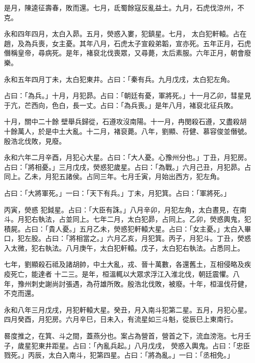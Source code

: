 \begin{pinyinscope}
 是月，陳逵征壽春，敗而還。七月，氐蜀餘寇反亂益土。九月，石虎伐涼州，不克。



 永和四年四月，太白入昴。五月，熒惑入婁，犯鎮星。七月，
 太白犯軒轅。占在趙，及為兵喪，女主憂。其年八月，石虎太子宣殺弟韜，宣亦死。五年正月，石虎僭稱皇帝，尋病死。是年，褚裒北伐喪眾，又尋薨，太后素服。六年正月，朝會廢樂。



 永和五年四月丁未，太白犯東井。占曰：「秦有兵。九月戊戌，太白犯左角。



 占曰：「為兵。」十月，月犯昴。占曰：「朝廷有憂，軍將死。」十一月乙卯，彗星見于亢，芒西向，色白，長一丈。占曰：「為兵喪。」是年八月，褚裒北征兵敗。



 十月，關中二十餘
 壁舉兵歸從，石遵攻沒南陽。十一月，冉閔殺石遵，又盡殺胡十餘萬人，於是中土大亂。十二月，褚裒薨。八年，劉顯、苻健、慕容俊並僭號。殷浩北伐敗，見廢。



 永和六年二月辛酉，月犯心大星。占曰：「大人憂。心豫州分也。」丁丑，月犯房。占曰：「將相憂。」三月戊戌，熒惑犯歲星。占曰：「為戰。」六月己丑，月犯昴。占同上。乙未，月犯五諸侯。占同三年。七月壬寅，月始出西方，犯左角。



 占曰：「大將軍死。」一曰：「天下有兵。」丁未，月犯箕。占曰：「軍將死。」



 丙寅，熒惑
 犯鉞星。占曰：「大臣有誅。」八月辛卯，月犯左角，太白晝見，在南斗。月犯右執法，占並同上。七年二月，太白犯昴，占同上。乙卯，熒惑輿鬼，犯積屍。占曰：「貴人憂。」五月乙未，熒惑犯軒轅大星。占曰：「女主憂。」太白入畢口，犯左股。占曰：「將相當之。」六月乙亥，月犯箕。丙子，月犯斗。丁丑，熒惑入太微，犯右執法。八月庚午，太白犯軒轅。戊子，太白犯右執法。占悉同上。



 七年，劉顯殺石祗及諸胡帥，中土大亂，戎、晉十萬數，各還舊土，互相侵略及疾疫死亡，能達者
 十二三。是年，桓溫輒以大眾求浮江入淮北伐，朝廷震懼。八年，豫州刺史謝尚討張遇，為苻雄所敗。殷浩北伐敗，被廢。十年，桓溫伐苻健，不克而還。



 永和八年三月戊戌，月犯軒轅大星。癸丑，月入南斗犯第二星。五月，月犯心星。四月癸酉，月犯房。六月辛巳，日未入，有流星如三斗魁，從辰巳上東南行。



 晷度推之，在箕、斗之間，蓋燕分也。案占為營首，營首之下，流血滂沲。七月壬子，歲星犯東井距星。占曰：「內亂兵起。」八月戊戌，
 熒惑入輿鬼。占曰：「忠臣戮死。」丙辰，太白入南斗，犯第四星。占曰：「將為亂。」一曰：「丞相免。」




\end{pinyinscope}
